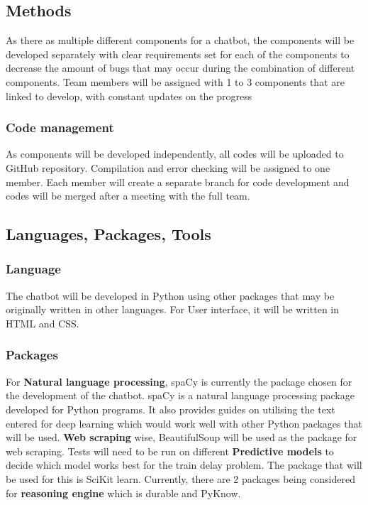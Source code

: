 \documentclass[11pt]{article}
\begin{document}
\subsection{Methods}
As there as multiple different components for a chatbot, the components will be developed separately with clear requirements set for each of the components to decrease the amount of bugs that may occur during the combination of different components. Team members will be assigned with 1 to 3 components that are linked to develop, with constant updates on the progress

\subsubsection{Code management}
As components will be developed independently, all codes will be uploaded to GitHub repository. Compilation and error checking will be assigned to one member. Each member will create a separate branch for code development and codes will be merged after a meeting with the full team.
             
\subsection{Languages, Packages, Tools}

\subsubsection{Language}
The chatbot will be developed in Python using other packages that may be originally written in other languages. For User interface, it will be written in HTML and CSS.

\subsubsection{Packages}
For \textbf{Natural language processing}, spaCy is currently the package chosen for the development of the chatbot. spaCy is a natural language processing package developed for Python programs. It also provides guides on utilising the text entered for deep learning which would work well with other Python packages that will be used. \textbf{Web scraping} wise, BeautifulSoup will be used as the package for web scraping. Tests will need to be run on different \textbf{Predictive models} to decide which model works best for the train delay problem. The package that will be used for this is SciKit learn. Currently, there are 2 packages being considered for \textbf{reasoning engine} which is durable and PyKnow.
\end{document}
